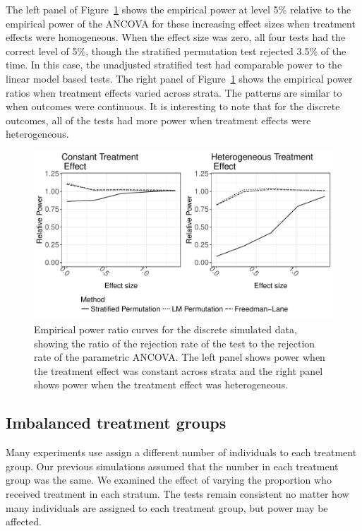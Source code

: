 \documentclass[12pt]{article}
\begin{document}
The left panel of Figure~\ref{fig:discrete_outcomes_sim_power} shows the empirical power at level 5\% relative to the empirical power of the ANCOVA for these increasing effect sizes when treatment effects were homogeneous.
When the effect size was zero, all four tests had the correct level of 5\%, though the stratified permutation test rejected 3.5\% of the time.
In this case, the unadjusted stratified test had comparable power to the linear model based tests.
The right panel of Figure~\ref{fig:discrete_outcomes_sim_power} shows the empirical power ratios when treatment effects varied across strata.
The patterns are similar to when outcomes were continuous.
It is interesting to note that for the discrete outcomes, all of the tests had more power when treatment effects were heterogeneous.
\begin{figure}[h]
\centering
\includegraphics[width = \textwidth]{fig/discrete_outcomes_simulation_power.pdf}
\caption{Empirical power ratio curves for the discrete simulated data, showing the ratio of the rejection rate of the test to the rejection rate of the parametric ANCOVA. The left panel shows power when the treatment effect was constant across strata and the right panel shows power when the treatment effect was heterogeneous.}
\label{fig:discrete_outcomes_sim_power}
\end{figure}

\subsection{Imbalanced treatment groups}
Many experiments use assign a different number of individuals to each treatment group.
Our previous simulations assumed that the number in each treatment group was the same.
We examined the effect of varying the proportion who received treatment in each stratum.
The tests remain consistent no matter how many individuals are assigned to each treatment group, 
but power may be affected.
\end{document}
